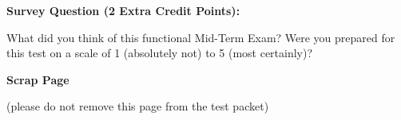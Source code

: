 \documentclass[letterpaper]{report}
\begin{document}
\ep
\vf
\newpage


{\large \bf Survey Question (2 Extra Credit Points):}

\vspace{0.5in}
What did you think of this functional Mid-Term Exam? Were you prepared for this test on a scale of 1 (absolutely not) to 5 (most certainly)?

\pg


{\large \bf Scrap Page}

(please do not remove this page from the test packet)
\pg


\showpoints
\end{document}
